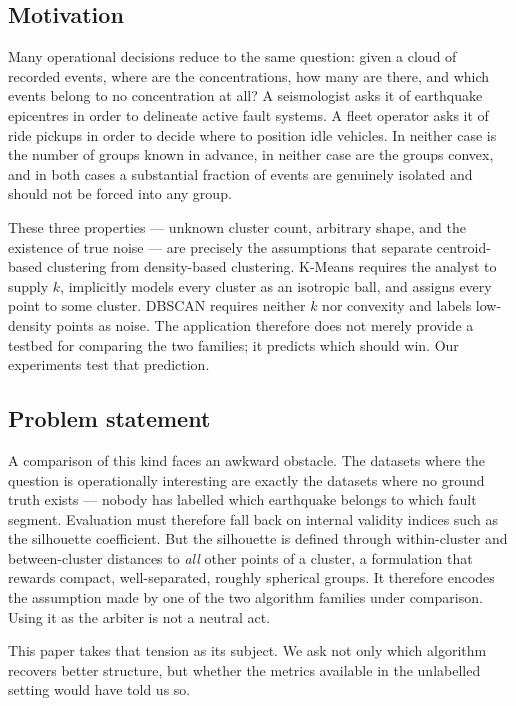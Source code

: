 \documentclass[11pt,a4paper]{article}
\begin{document}
\subsection{Motivation}
Many operational decisions reduce to the same question: given a cloud of
recorded events, where are the concentrations, how many are there, and which
events belong to no concentration at all? A seismologist asks it of earthquake
epicentres in order to delineate active fault systems. A fleet operator asks it
of ride pickups in order to decide where to position idle vehicles. In neither
case is the number of groups known in advance, in neither case are the groups
convex, and in both cases a substantial fraction of events are genuinely
isolated and should not be forced into any group.

These three properties --- unknown cluster count, arbitrary shape, and the
existence of true noise --- are precisely the assumptions that separate
centroid-based clustering from density-based clustering. K-Means requires the
analyst to supply $k$, implicitly models every cluster as an isotropic ball, and
assigns every point to some cluster. DBSCAN requires neither $k$ nor convexity
and labels low-density points as noise. The application therefore does not merely
provide a testbed for comparing the two families; it predicts which should win.
Our experiments test that prediction.

\subsection{Problem statement}
A comparison of this kind faces an awkward obstacle. The datasets where the
question is operationally interesting are exactly the datasets where no ground
truth exists --- nobody has labelled which earthquake belongs to which fault
segment. Evaluation must therefore fall back on internal validity indices such
as the silhouette coefficient. But the silhouette is defined through
within-cluster and between-cluster distances to \emph{all} other points of a
cluster, a formulation that rewards compact, well-separated, roughly spherical
groups. It therefore encodes the assumption made by one of the two algorithm
families under comparison. Using it as the arbiter is not a neutral act.

This paper takes that tension as its subject. We ask not only which algorithm
recovers better structure, but whether the metrics available in the unlabelled
setting would have told us so.
\end{document}
